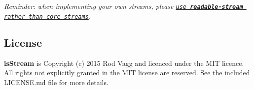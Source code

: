 {\itshape Reminder\+: when implementing your own streams, please \href{http://r.va.gg/2014/06/why-i-dont-use-nodes-core-stream-module.html}{\tt use {\bfseries readable-\/stream} rather than core streams}.}

\subsection*{License}

{\bfseries is\+Stream} is Copyright (c) 2015 Rod Vagg \href{https://twitter.com/rvagg}{\tt } and licenced under the M\+IT licence. All rights not explicitly granted in the M\+IT license are reserved. See the included L\+I\+C\+E\+N\+S\+E.\+md file for more details. 